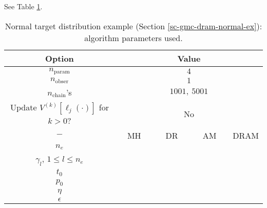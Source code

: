 See Table \ref{tab-dram-normal-ex-alg-params}.

\begin{table}[h!]
\begin{center}
\begin{tabular}{|c|c|c|c|c|}
\hline
Option                                            & \multicolumn{4}{c|}{Value}                                   \\
\hline
\hline
$n_{\text{param}}$                                  & \multicolumn{4}{c|}{$4$}                                     \\
\hline
$n_{\text{obser}}$                                  & \multicolumn{4}{c|}{$1$}                                     \\
\hline
$n_{\text{chain}}$'s                              & \multicolumn{4}{c|}{$1001,~5001$}                            \\
\hline
Update $V^{(k)}[\ell_j(\cdot)]$ for $k>0$?        & \multicolumn{4}{c|}{No}                                      \\
\hline
\hline
$-$                                               & ~~MH~~            & ~~DR~~       & ~~AM~~       & DRAM       \\
\hline
$n_e$                                             &                   &              &              &            \\
\hline
$\gamma_l$,
$1\leqslant l\leqslant n_e$                       &                   &              &              &            \\
\hline
\hline
$t_0$                                             &                   &              &              &            \\
\hline
$p_0$                                             &                   &              &              &            \\
\hline
$\eta$                                            &                   &              &              &            \\
\hline
$\epsilon$                                        &                   &              &              &            \\
\hline
\end{tabular}
\caption{Normal target distribution example (Section \ref{sc-gmc-dram-normal-ex}):
algorithm parameters used.
}
\label{tab-dram-normal-ex-alg-params}
\end{center}
\end{table}

